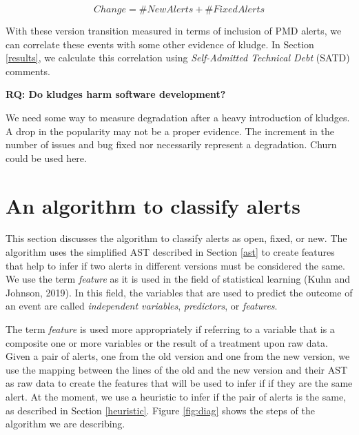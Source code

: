 \documentclass[
]{article}
\begin{document}
\[Change = \#NewAlerts + \#FixedAlerts\]


With these version transition measured in terms of inclusion of PMD
alerts, we can correlate these events with some other evidence of 
kludge. In Section \ref{results}, we calculate this correlation using
\textit{Self-Admitted Technical Debt} (SATD) comments.

%
%

\vspace{16px}

\noindent \textbf{RQ: Do kludges harm software development?}
\label{kludge_harm}

We need some way to measure degradation after a heavy introduction of
kludges. A drop in the popularity may not be a proper evidence. The
increment in the number of issues and bug fixed nor necessarily
represent a degradation. Churn could be used here.

%
%

\section{An algorithm to classify alerts}
\label{alg}

This section discusses the algorithm to classify alerts as open, fixed,
or new. The algorithm uses the simplified AST described in Section
\ref{ast} to create features that help to infer if two alerts in
different versions must be considered the same. We use the term
\textit{feature} as it is used in the field of statistical learning (Kuhn and
Johnson, 2019). In this field, the variables that are used to predict
the outcome of an event are called \emph{independent variables},
\emph{predictors}, or \emph{features}. 

The term \emph{feature} is used more appropriately if referring to a variable 
that is a composite one or more variables or the result of a treatment upon 
raw data. Given a pair of alerts, one from the old version and one from
the new version, we use the mapping between the lines of the old and the
new version and their AST as raw data to create the features that will
be used to infer if if they are the same alert. At the moment, we use a
heuristic to infer if the pair of alerts is the same, as described in
Section \ref{heuristic}. Figure \ref{fig:diag} shows the steps of the 
algorithm we are describing. 
\end{document}
